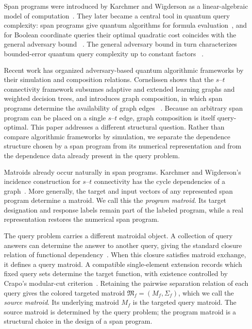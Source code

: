\documentclass[11pt]{article}
\numberwithin{equation}{section}
\theoremstyle{remark}
\begin{document}
Span programs were introduced by Karchmer and Wigderson as a
linear-algebraic model of computation~\cite{KarchmerWigderson1993}. They
later became a central tool in quantum query complexity: span programs give
quantum algorithms for formula evaluation~\cite{ReichardtSpalek2008}, and
for Boolean coordinate queries their optimal quadratic cost coincides with
the general adversary bound
~\cite{Reichardt2009,Reichardt2014Equivalent}. The general adversary bound
in turn characterizes bounded-error quantum query complexity up to constant
factors
~\cite{HoyerLeeSpalek2007,Reichardt2011,
LeeMittalReichardtSpalekSzegedy2011}.

Recent work has organized adversary-based quantum algorithmic frameworks by
their simulation and composition relations. Cornelissen shows that the
$s$--$t$ connectivity framework subsumes adaptive and extended learning
graphs and weighted decision trees, and introduces graph composition, in
which span programs determine the availability of graph edges
~\cite{Cornelissen2025GraphComposition}. Because an arbitrary span program
can be placed on a single $s$--$t$ edge, graph composition is itself
query-optimal. This paper addresses a different structural question. Rather
than compare algorithmic frameworks by simulation, we separate the
dependence structure chosen by a span program from its numerical
representation and from the dependence data already present in the query
problem.

Matroids already occur naturally in span programs. Karchmer and
Wigderson's incidence construction for $s$--$t$ connectivity has the cycle
dependencies of a graph~\cite{KarchmerWigderson1993}. More generally, the
target and input vectors of any represented span program determine a
matroid. We call this the \emph{program matroid}. Its target designation and
response labels remain part of the labeled program, while a real
representation restores the numerical span program.

The query problem carries a different matroidal object. A collection of
query answers can determine the answer to another query, giving the standard
closure relation of functional dependency~\cite{Armstrong1974,Matus1991}.
When this closure satisfies matroid exchange, it defines a query matroid. A
compatible single-element extension records which fixed query sets determine
the target function, with existence controlled by Crapo's modular-cut
criterion~\cite{Crapo1965,Oxley2011}. Retaining the pairwise separation
relation of each query gives the colored targeted matroid
$\mathfrak M_f=(M_f,\Sigma_f)$, which we call the \emph{source matroid}. Its
underlying matroid $M_f$ is the targeted query matroid. The source matroid is
determined by the query problem; the program matroid is a structural choice
in the design of a span program.
\end{document}

